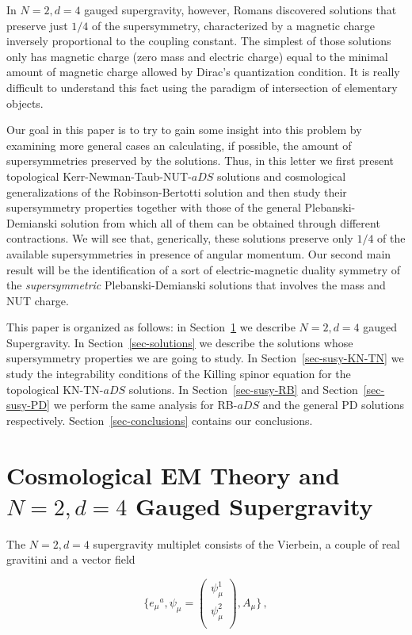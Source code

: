 \documentclass[12pt,a4paper]{article}
\begin{document}
In $N=2,d=4$ gauged supergravity, however, Romans discovered solutions
that preserve just $1/4$ of the supersymmetry, characterized by a
magnetic charge inversely proportional to the coupling constant. The
simplest of those solutions only has magnetic charge (zero mass and
electric charge) equal to the minimal amount of magnetic charge
allowed by Dirac's quantization condition. It is really difficult to
understand this fact using the paradigm of intersection of elementary
objects.

Our goal in this paper is to try to gain some insight into this problem
by examining more general cases an calculating, if possible, the
amount of supersymmetries preserved by the solutions. Thus, in this
letter we first present topological Kerr-Newman-Taub-NUT-$aDS$
solutions and cosmological generalizations of the Robinson-Bertotti
solution and then study their supersymmetry properties together with
those of the general Plebanski-Demianski solution from which all of
them can be obtained through different contractions. We will see that,
generically, these solutions preserve only $1/4$ of the available
supersymmetries in presence of angular momentum. Our second main result
will be the identification of a sort of electric-magnetic duality 
symmetry of the {\it supersymmetric} Plebanski-Demianski solutions
that involves the mass and NUT charge.

This paper is organized as follows: in Section~\ref{sec-N2} we
describe $N=2,d=4$ gauged Supergravity. In Section~\ref{sec-solutions}
we describe the solutions whose supersymmetry properties we are going
to study. In Section~\ref{sec-susy-KN-TN} we study the integrability
conditions of the Killing spinor equation for the topological
KN-TN-$aDS$ solutions. In Section~\ref{sec-susy-RB} and
Section~\ref{sec-susy-PD} we perform the same analysis for RB-$aDS$
and the general PD solutions respectively.
Section~\ref{sec-conclusions} contains our conclusions.


\section{Cosmological EM Theory and $N=2,d=4$ Gauged
Supergravity}
\label{sec-N2}

The $N=2,d=4$ supergravity multiplet consists of the Vierbein, a couple
of real gravitini and a vector field

\begin{equation}
\{e_{\mu}{}^{a},\psi_{\mu}=
\left(
\begin{array}{c}
\psi^{1}_{\mu}\\
\psi^{2}_{\mu}\\
\end{array}
\right),A_{\mu}\}\, ,
\end{equation}
\end{document}

